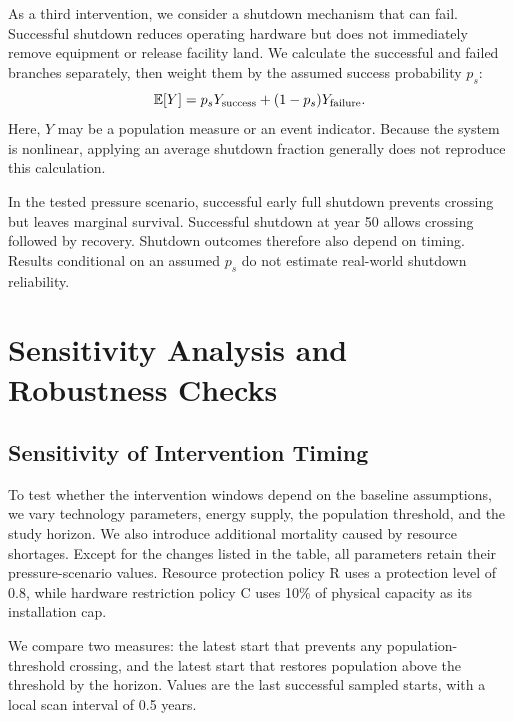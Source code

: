 \documentclass[12pt,a4paper]{article}
\theoremstyle{remark}
\begin{document}
As a third intervention, we consider a shutdown mechanism that can fail. Successful shutdown reduces operating hardware but does not immediately remove equipment or release facility land. We calculate the successful and failed branches separately, then weight them by the assumed success probability $p_s$:
\[
\mathbb E[Y]=p_sY_{\rm success}+(1-p_s)Y_{\rm failure}.
\]
Here, $Y$ may be a population measure or an event indicator. Because the system is nonlinear, applying an average shutdown fraction generally does not reproduce this calculation.

In the tested pressure scenario, successful early full shutdown prevents crossing but leaves marginal survival. Successful shutdown at year 50 allows crossing followed by recovery. Shutdown outcomes therefore also depend on timing. Results conditional on an assumed $p_s$ do not estimate real-world shutdown reliability.


\section{Sensitivity Analysis and Robustness Checks}\label{sec:sensitivity}
\subsection{Sensitivity of Intervention Timing}
To test whether the intervention windows depend on the baseline assumptions, we vary technology parameters, energy supply, the population threshold, and the study horizon. We also introduce additional mortality caused by resource shortages. Except for the changes listed in the table, all parameters retain their pressure-scenario values. Resource protection policy R uses a protection level of 0.8, while hardware restriction policy C uses 10\% of physical capacity as its installation cap.

We compare two measures: the latest start that prevents any population-threshold crossing, and the latest start that restores population above the threshold by the horizon. Values are the last successful sampled starts, with a local scan interval of 0.5 years.
\end{document}
